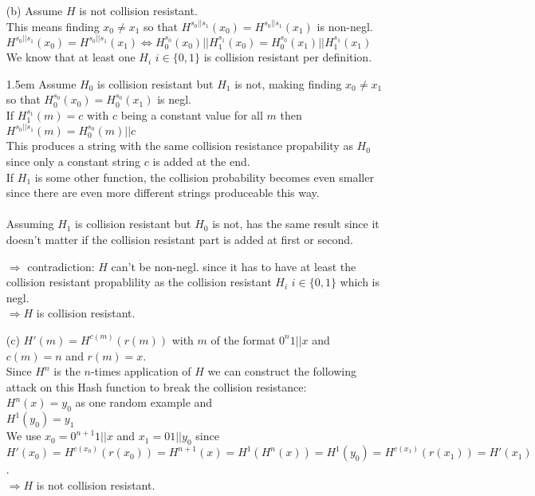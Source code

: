 \begin{itemize}
\item[(b)]
	Assume \(H\) is not collision resistant. \\
	This means finding \(x_0 \neq x_1\) so that \(H^{s_0 \vert\vert s_1}(x_0) = H^{s_0 \vert\vert s_1}(x_1)\) is non-negl. \\
	\(H^{s_0 \vert\vert s_1}(x_0) = H^{s_0 \vert\vert s_1}(x_1) \Leftrightarrow H^{s_0}_0(x_0) \vert\vert H^{s_1}_1(x_0) = H^{s_0}_0(x_1) \vert\vert H^{s_1}_1(x_1) \) \\
	We know that at least one \(H_i\) \(i \in \{0,1\}\) is collision resistant per definition. \\
	\par
	\begingroup
	\leftskip1.5em
	\rightskip\leftskip
		Assume \(H_0\) is collision resistant but \(H_1\) is not, making finding \(x_0 \neq x_1\) so that \(H^{s_0}_0(x_0) = H^{s_0}_0(x_1)\) is negl. \\
		If \(H^{s_1}_1(m) = c\) with \(c\) being a constant value for all \(m\) then \(H^{s_0 \vert\vert s_1}(m) = H^{s_0}_0(m) \vert\vert c\)\\
		This produces a string with the same collision resistance propability as \(H_0\) since only a constant string \(c\) is added at the end.\\
		If \(H_1\) is some other function, the collision probability becomes even smaller since there are even more different strings produceable this way.\\ 
		\\
		Assuming \(H_1\) is collision resistant but \(H_0\) is not, has the same result since it doesn't matter if the collision resistant part is added at first or 				second. \\
	\par
	\endgroup
	\(\Rightarrow\) contradiction: \(H\) can't be non-negl. since it has to have at least the collision resistant propablility as the collision resistant  \(H_i\) \(i \in \{0,1\}\) which is negl. \\
	\(\Rightarrow H\) is collision resistant.\\

\item[(c)] 
	\(H'(m) = H^{c(m)}(r(m))\) with \(m\) of the format \(0^n1\vert\vert x\) and \(c(m) = n\) and \(r(m) = x\). \\
	Since \(H^n\) is the \(n\)-times application of \(H\) we can construct the following attack on this Hash function to break the collision resistance: \\
	\(H^{n}(x) = y_0\) as one random example and \\ 
	\(H^1(y_0) = y_1\) \\
	We use \(x_0 = 0^{n + 1}1 \vert\vert x\) and \(x_1 = 01 \vert\vert y_0\) since\\
	\(H'(x_0) = H^{c(x_0)}(r(x_0)) = H^{n+1}(x) = H^1(H^n (x)) = H^1(y_0) = H^{c(x_1)}(r(x_1)) = H'(x_1)\). \\
	\(\Rightarrow H\) is not collision resistant.\\
	
\end{itemize}  
  